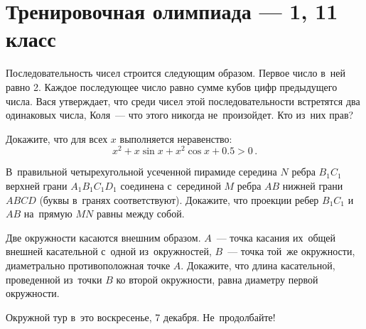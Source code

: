 
\section*{Тренировочная олимпиада --- 1, 11 класс}


\begin{problems}

\item
Последовательность чисел строится следующим образом.
Первое число в~ней равно 2.
Каждое последующее число равно сумме кубов цифр предыдущего числа.
Вася утверждает, что среди чисел этой последовательности встретятся два
одинаковых числа, Коля~--- что этого никогда не~произойдет.
Кто из~них прав?

\item
Докажите, что для всех $x$ выполняется неравенство:
\[
    x^2 + x \sin x + x^2 \cos x + 0.5 > 0
\,.\]

\item
В~правильной четырехугольной усеченной пирамиде середина $N$ ребра $B_1 C_1$
верхней грани $A_1 B_1 C_1 D_1$ соединена с~серединой $M$ ребра $AB$ нижней
грани $ABCD$ (буквы в~гранях соответствуют).
Докажите, что проекции ребер $B_1 C_1$ и~$AB$ на~прямую $MN$ равны между собой.

\item
Две окружности касаются внешним образом.
$A$~--- точка касания их~общей внешней касательной с~одной из~окружностей,
$B$~--- точка той~же окружности, диаметрально противоположная точке $A$.
Докажите, что длина касательной, проведенной из~точки $B$ ко второй окружности,
равна диаметру первой окружности.

\end{problems}

\begin{center}\small\sffamily
Окружной тур в~это воскресенье, 7 декабря.
Не~продолбайте!
\end{center}

